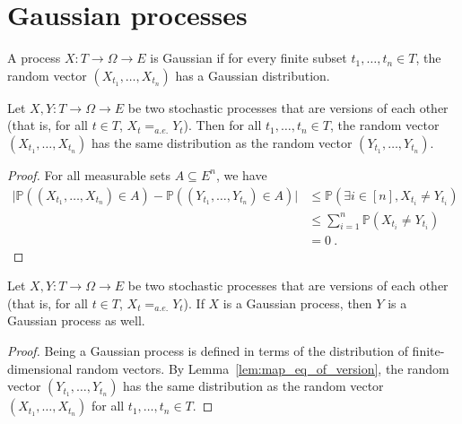 \section{Gaussian processes}
\label{sec:gaussian_processes}

\begin{definition}\label{def:IsGaussianProcess}
A process $X : T \to \Omega \to E$ is Gaussian if for every finite subset $t_1, \ldots, t_n \in T$, the random vector $(X_{t_1}, \ldots, X_{t_n})$ has a Gaussian distribution.
\end{definition}


\begin{lemma}\label{lem:map_eq_of_version}
Let $X, Y : T \to \Omega \to E$ be two stochastic processes that are versions of each other (that is, for all $t \in T$, $X_t =_{a.e.} Y_t$).
Then for all $t_1, \ldots, t_n \in T$, the random vector $(X_{t_1}, \ldots, X_{t_n})$ has the same distribution as the random vector $(Y_{t_1}, \ldots, Y_{t_n})$.
\end{lemma}

\begin{proof}
For all measurable sets $A \subseteq E^n$, we have
\begin{align*}
  \vert \mathbb{P}((X_{t_1}, \ldots, X_{t_n}) \in A) - \mathbb{P}((Y_{t_1}, \ldots, Y_{t_n}) \in A) \vert
  &\le \mathbb{P}(\exists i \in [n], X_{t_i} \ne Y_{t_i})
  \\
  &\le \sum_{i=1}^n \mathbb{P}(X_{t_i} \ne Y_{t_i})
  \\
  &= 0
  \: .
\end{align*}
\end{proof}


\begin{lemma}\label{lem:isGaussianProcess_of_version}
Let $X, Y : T \to \Omega \to E$ be two stochastic processes that are versions of each other (that is, for all $t \in T$, $X_t =_{a.e.} Y_t$).
If $X$ is a Gaussian process, then $Y$ is a Gaussian process as well.
\end{lemma}

\begin{proof}
Being a Gaussian process is defined in terms of the distribution of finite-dimensional random vectors.
By Lemma~\ref{lem:map_eq_of_version}, the random vector $(Y_{t_1}, \ldots, Y_{t_n})$ has the same distribution as the random vector $(X_{t_1}, \ldots, X_{t_n})$ for all $t_1, \ldots, t_n \in T$.
\end{proof}
